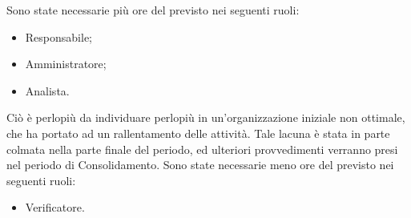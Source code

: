 Sono state necessarie più ore del previsto nei seguenti ruoli:
\begin{itemize}
	\item Responsabile;
	\item Amministratore;
	\item Analista.
\end{itemize}
Ciò è perlopiù da individuare perlopiù in un'organizzazione iniziale non ottimale, che ha portato ad un rallentamento delle attività. Tale lacuna è stata in parte colmata nella parte finale del periodo, ed ulteriori provvedimenti verranno presi nel periodo di Consolidamento.
\newline
Sono state necessarie meno ore del previsto nei seguenti ruoli:
\begin{itemize}
	\item Verificatore.
\end{itemize}
